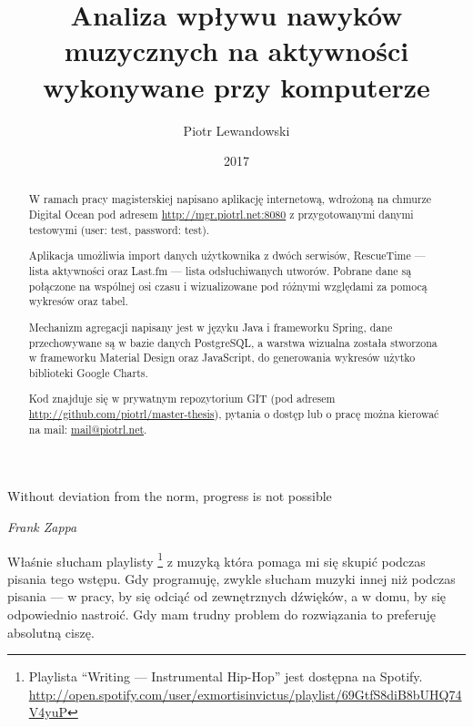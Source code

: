 \documentclass[openright]{xmgr}
\author   {Piotr Lewandowski}
\title    {Analiza wpływu nawyków muzycznych na aktywności wykonywane przy komputerze}
\date     {2017}
\begin{document}
\begin{abstract}
    W ramach pracy magisterskiej napisano aplikację internetową,
    wdrożoną na chmurze Digital Ocean pod adresem \url{http://mgr.piotrl.net:8080}
    z przygotowanymi danymi testowymi (user: test, password: test).

    Aplikacja umożliwia import danych użytkownika z dwóch serwisów,
    RescueTime — lista aktywności oraz
    Last.fm — lista odsłuchiwanych utworów.
    Pobrane dane są połączone na wspólnej osi czasu i wizualizowane pod różnymi względami za pomocą wykresów oraz tabel.

    Mechanizm agregacji napisany jest w języku Java i frameworku Spring,
    dane przechowywane są w bazie danych PostgreSQL,
    a warstwa wizualna została stworzona w frameworku Material Design oraz JavaScript,
    do generowania wykresów użytko biblioteki Google Charts.

    Kod znajduje się w prywatnym repozytorium GIT (pod adresem \url{http://github.com/piotrl/master-thesis}),
    pytania o dostęp lub o pracę można kierować na mail: \url{mail@piotrl.net}.
\end{abstract}


\maketitle

\introduction

\epigraph{Without deviation from the norm, progress is not possible}{\textit{Frank Zappa}}

    Właśnie słucham playlisty
    \footnote{Playlista ``Writing --- Instrumental Hip-Hop'' jest dostępna na Spotify.
    \url{http://open.spotify.com/user/exmortisinvictus/playlist/69GtfS8diB8bUHQ74V4yuP}}
    z muzyką która pomaga mi się skupić podczas pisania tego wstępu.
    Gdy programuję, zwykle słucham muzyki innej niż podczas pisania ---
    w pracy, by się odciąć od zewnętrznych dźwięków, a w domu, by się odpowiednio nastroić.
    Gdy mam trudny problem do rozwiązania to preferuję absolutną ciszę.
\end{document}
